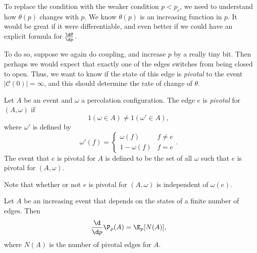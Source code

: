 \documentclass[a4paper]{article}
\begin{document}
To replace the condition with the weaker condition $p < p_c$, we need to understand how $\theta(p)$ changes with $p$. We know $\theta(p)$ is an increasing function in $p$. It would be great if it were differentiable, and even better if we could have an explicit formula for $\frac{\d \theta}{\d p}$.

To do so, suppose we again do coupling, and increase $p$ by a really tiny bit. Then perhaps we would expect that exactly one of the edges switches from being closed to open. Thus, we want to know if the state of this edge is \emph{pivotal} to the event $|\mathcal{C}(0)| = \infty$, and this should determine the rate of change of $\theta$.

\begin{defi}
  Let $A$ be an event and $\omega$ a percolation configuration. The edge $e$ is \emph{pivotal} for $(A, \omega)$ if
  \[
    1(\omega \in A) \not= 1(\omega' \in A),
  \]
  where $\omega'$ is defined by
  \[
    \omega'(f) =
    \begin{cases}
      \omega(f) & f \not= e\\
      1 - \omega(f) & f = e
    \end{cases}.
  \]
  The event that $e$ is pivotal for $A$ is defined to be the set of all $\omega$ such that $e$ is pivotal for $(A, \omega)$.
\end{defi}
Note that whether or not $e$ is pivotal for $(A, \omega)$ is independent of $\omega(e)$.

\begin{thm}
  Let $A$ be an increasing event that depends on the states of a finite number of edges. Then
  \[
    \frac{\d}{\d p} \P_p(A) = \E_p[N(A)],
  \]
  where $N(A)$ is the number of pivotal edges for $A$.
\end{thm}
\end{document}
